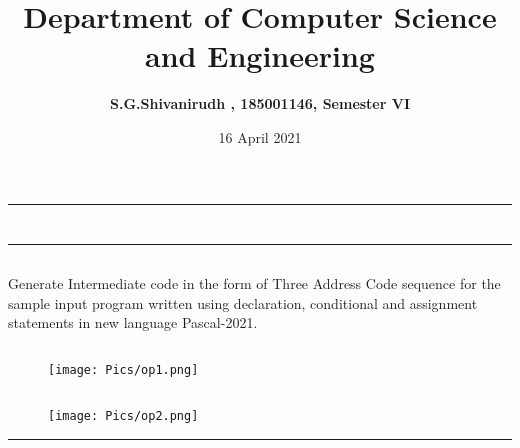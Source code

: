 \documentclass[12pt,letterpaper]{article}
\title{\textbf{Department of Computer Science and Engineering}}
\author{\textbf{S.G.Shivanirudh , 185001146, Semester VI }}
\date{16 April 2021}
\begin{document}
\maketitle
\hrule
\section*{}
\hrule 
\bigskip\bigskip

\subsection*{}

\subsection*{}
\begin{flushleft}
    Generate Intermediate code in the form of Three Address Code sequence for the sample input program written 
    using declaration, conditional and assignment statements in new language Pascal-2021.
\end{flushleft}

\subsection*{}
\subsubsection*{}
\begin{flushleft}

\end{flushleft}
\subsubsection*{}
\begin{flushleft}

\end{flushleft}

\newpage
\subsection*{}
\begin{figure}[h]
    \centering
    \texttt{[image: Pics/op1.png]}
\end{figure}
\subsection*{}
\begin{figure}[h]
    \centering
    \texttt{[image: Pics/op2.png]}
\end{figure}
\hrule
\end{document}
